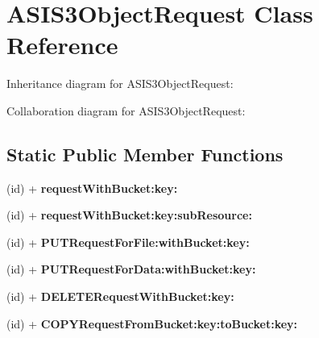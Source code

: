 \hypertarget{interface_a_s_i_s3_object_request}{
\section{\-A\-S\-I\-S3\-Object\-Request \-Class \-Reference}
\label{interface_a_s_i_s3_object_request}
}


\-Inheritance diagram for \-A\-S\-I\-S3\-Object\-Request\-:


\-Collaboration diagram for \-A\-S\-I\-S3\-Object\-Request\-:
\subsection*{\-Static \-Public \-Member \-Functions}
\begin{DoxyCompactItemize}
\item 
\hypertarget{interface_a_s_i_s3_object_request_a8fc06d7585b85db69f81678fc1560ab0}{
(id) + {\bfseries request\-With\-Bucket\-:key\-:}}
\label{interface_a_s_i_s3_object_request_a8fc06d7585b85db69f81678fc1560ab0}

\item 
\hypertarget{interface_a_s_i_s3_object_request_aac357e6e8d9eab201a5d97c6e2ad1574}{
(id) + {\bfseries request\-With\-Bucket\-:key\-:sub\-Resource\-:}}
\label{interface_a_s_i_s3_object_request_aac357e6e8d9eab201a5d97c6e2ad1574}

\item 
\hypertarget{interface_a_s_i_s3_object_request_a07ff4bdb86902d59cb602be9bdc7ac14}{
(id) + {\bfseries \-P\-U\-T\-Request\-For\-File\-:with\-Bucket\-:key\-:}}
\label{interface_a_s_i_s3_object_request_a07ff4bdb86902d59cb602be9bdc7ac14}

\item 
\hypertarget{interface_a_s_i_s3_object_request_a06b5bf032c9b54a0fd0b17e0d1fecad5}{
(id) + {\bfseries \-P\-U\-T\-Request\-For\-Data\-:with\-Bucket\-:key\-:}}
\label{interface_a_s_i_s3_object_request_a06b5bf032c9b54a0fd0b17e0d1fecad5}

\item 
\hypertarget{interface_a_s_i_s3_object_request_a0602fac9aee5730f513b0a49e2be0dd9}{
(id) + {\bfseries \-D\-E\-L\-E\-T\-E\-Request\-With\-Bucket\-:key\-:}}
\label{interface_a_s_i_s3_object_request_a0602fac9aee5730f513b0a49e2be0dd9}

\item 
\hypertarget{interface_a_s_i_s3_object_request_a0048cc08b9cfef9c78abd81faa472d48}{
(id) + {\bfseries \-C\-O\-P\-Y\-Request\-From\-Bucket\-:key\-:to\-Bucket\-:key\-:}}
\label{interface_a_s_i_s3_object_request_a0048cc08b9cfef9c78abd81faa472d48}


\end{DoxyCompactItemize}
